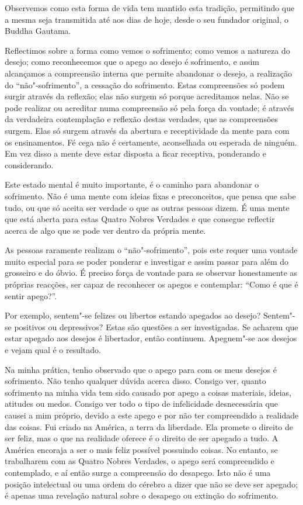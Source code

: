 Observemos como esta forma de vida tem mantido esta tradição, permitindo que a
mesma seja transmitida até aos dias de hoje, desde o seu fundador original, o
Buddha Gautama.

Reflectimos sobre a forma como vemos o sofrimento; como vemos a natureza do
desejo; como reconhecemos que o apego ao desejo é sofrimento, e assim alcançamos
a compreensão interna que permite abandonar o desejo, a realização do
“não"-sofrimento”, a cessação do sofrimento. Estas compreensões só podem surgir
através da reflexão; elas não surgem só porque acreditamos nelas. Não se pode
realizar ou acreditar numa compreensão só pela força da vontade; é através da 
verdadeira contemplação e reflexão destas verdades, que as compreensões surgem. 
Elas só surgem através da abertura e receptividade da mente para com os ensinamentos. 
Fé cega não é certamente, aconselhada ou esperada de ninguém. Em vez disso a mente
deve estar disposta a ficar receptiva, ponderando e considerando.

Este estado mental é muito importante, é o caminho para abandonar o sofrimento.
Não é uma mente com ideias fixas e preconceitos, que pensa que sabe tudo, ou que
só aceita ser verdade o que as outras pessoas dizem. É uma mente que está aberta
para estas Quatro Nobres Verdades e que consegue reflectir acerca de algo que se
pode ver dentro da própria mente.

As pessoas raramente realizam o “não"-sofrimento”, pois este requer uma vontade
muito especial para se poder ponderar e investigar e assim passar para além do
grosseiro e do óbvio. É preciso força de vontade para se observar honestamente
as próprias reacções, ser capaz de reconhecer os apegos e contemplar: “Como é
que é sentir apego?”.

Por exemplo, sentem"-se felizes ou libertos estando apegados ao desejo?
Sentem"-se positivos ou depressivos? Estas são questões a ser investigadas. Se
acharem que estar apegado aos desejos é libertador, então continuem. Apeguem"-se
aos desejos e vejam qual é o resultado.

Na minha prática, tenho observado que o apego para com os meus desejos é
sofrimento. Não tenho qualquer dúvida acerca disso. Consigo ver, quanto
sofrimento na minha vida tem sido causado por apego a coisas materiais, ideias,
atitudes ou medos. Consigo ver todo o tipo de infelicidade desnecessária que
causei a mim próprio, devido a este apego e por não ter compreendido a realidade 
das coisas. Fui criado na América, a terra da liberdade. Ela promete o
direito de ser feliz, mas o que na realidade oferece é o direito de ser apegado
a tudo. A América encoraja a ser o mais feliz possível possuindo coisas. No
entanto, se trabalharem com as Quatro Nobres Verdades, o apego será compreendido
e contemplado, e aí então surge a compreensão do desapego. Isto não é uma posição
intelectual ou uma ordem do cérebro a dizer que não se deve ser apegado; é
apenas uma revelação natural sobre o desapego ou extinção do sofrimento.

